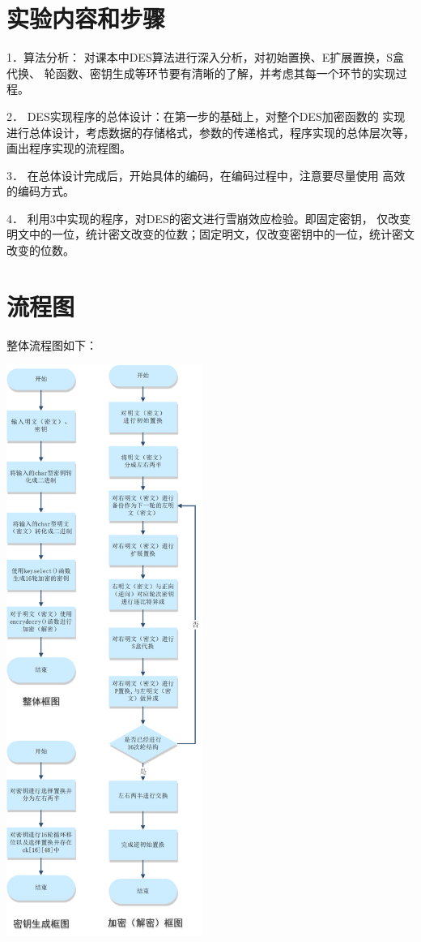 \documentclass[UTF8,a4paper]{article}
\begin{document}
	\section{实验内容和步骤}
1．算法分析：
对课本中DES算法进行深入分析，对初始置换、E扩展置换，S盒代换、
轮函数、密钥生成等环节要有清晰的了解，并考虑其每一个环节的实现过程。\par 
2．	DES实现程序的总体设计：在第一步的基础上，对整个DES加密函数的
实现进行总体设计，考虑数据的存储格式，参数的传递格式，程序实现的总体层次等，画出程序实现的流程图。   \par 
3．	在总体设计完成后，开始具体的编码，在编码过程中，注意要尽量使用
高效的编码方式。\par 
4．	利用3中实现的程序，对DES的密文进行雪崩效应检验。即固定密钥，
仅改变明文中的一位，统计密文改变的位数；固定明文，仅改变密钥中的一位，统计密文改变的位数。\par \section{流程图}
整体流程图如下：\par 
	\begin{center}
	
	\includegraphics[width=0.48\textwidth]{image.PNG}

\end{center}
\end{document}
